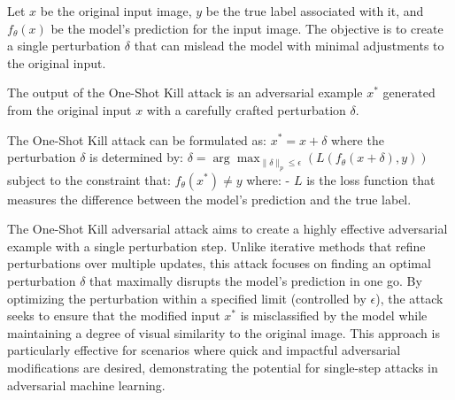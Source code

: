 Let $x$ be the original input image, $y$ be the true label associated with it, and $f_\theta(x)$ be the model's prediction for the input image. The objective is to create a single perturbation $\delta$ that can mislead the model with minimal adjustments to the original input.

The output of the One-Shot Kill attack is an adversarial example $x^*$ generated from the original input $x$ with a carefully crafted perturbation $\delta$.

The One-Shot Kill attack can be formulated as:
$x^* = x + \delta$
where the perturbation $\delta$ is determined by:
$\delta = \arg\max_{\|\delta\|_p \leq \epsilon} \left( L(f_\theta(x + \delta), y) \right)$
subject to the constraint that:
$f_\theta(x^*) \neq y$
where:
- $L$ is the loss function that measures the difference between the model's prediction and the true label.

The One-Shot Kill adversarial attack aims to create a highly effective adversarial example with a single perturbation step. Unlike iterative methods that refine perturbations over multiple updates, this attack focuses on finding an optimal perturbation $\delta$ that maximally disrupts the model's prediction in one go. By optimizing the perturbation within a specified limit (controlled by $\epsilon$), the attack seeks to ensure that the modified input $x^*$ is misclassified by the model while maintaining a degree of visual similarity to the original image. This approach is particularly effective for scenarios where quick and impactful adversarial modifications are desired, demonstrating the potential for single-step attacks in adversarial machine learning.
